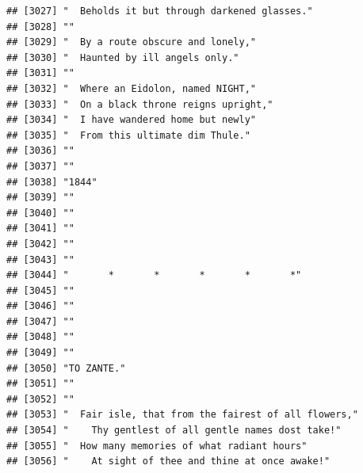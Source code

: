 \documentclass{article}\usepackage[]{graphicx}\usepackage[]{color}
\makeatletter
\newenvironment{kframe}{%
 \def\at@end@of@kframe{}%
 \ifinner\ifhmode%
  \def\at@end@of@kframe{\end{minipage}}%
  \begin{minipage}{\columnwidth}%
 \fi\fi%
 \def\FrameCommand##1{\hskip\@totalleftmargin \hskip-\fboxsep
 \colorbox{shadecolor}{##1}\hskip-\fboxsep
     \hskip-\linewidth \hskip-\@totalleftmargin \hskip\columnwidth}%
 \MakeFramed {\advance\hsize-\width
   \@totalleftmargin\z@ \linewidth\hsize
   \@setminipage}}%
 {\par\unskip\endMakeFramed%
 \at@end@of@kframe}
\newenvironment{knitrout}{}{} %
\makeatother
\begin{document}
\begin{knitrout}
\begin{kframe}
\begin{verbatim}
## [3027] "  Beholds it but through darkened glasses."                                  
## [3028] ""                                                                            
## [3029] "  By a route obscure and lonely,"                                            
## [3030] "  Haunted by ill angels only."                                               
## [3031] ""                                                                            
## [3032] "  Where an Eidolon, named NIGHT,"                                            
## [3033] "  On a black throne reigns upright,"                                         
## [3034] "  I have wandered home but newly"                                            
## [3035] "  From this ultimate dim Thule."                                             
## [3036] ""                                                                            
## [3037] ""                                                                            
## [3038] "1844"                                                                        
## [3039] ""                                                                            
## [3040] ""                                                                            
## [3041] ""                                                                            
## [3042] ""                                                                            
## [3043] ""                                                                            
## [3044] "       *       *       *       *       *"                                    
## [3045] ""                                                                            
## [3046] ""                                                                            
## [3047] ""                                                                            
## [3048] ""                                                                            
## [3049] ""                                                                            
## [3050] "TO ZANTE."                                                                   
## [3051] ""                                                                            
## [3052] ""                                                                            
## [3053] "  Fair isle, that from the fairest of all flowers,"                          
## [3054] "    Thy gentlest of all gentle names dost take!"                             
## [3055] "  How many memories of what radiant hours"                                   
## [3056] "    At sight of thee and thine at once awake!"                               

\end{verbatim}
\end{kframe}
\end{knitrout}
\end{document}
